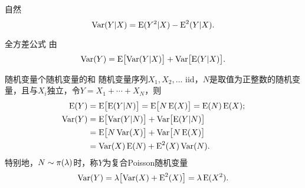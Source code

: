自然
\begin{equation}
	\Var(Y|X)=\E(Y^2|X)-\E^2(Y|X).
\end{equation}
\begin{theorem}{全方差公式}{}
	由
	\begin{equation}
		\Var(Y)=\E\bigfkh{\Var(Y|X)}+\Var\bigfkh{\E(Y|X)}.
	\end{equation}
\end{theorem}
\begin{example}{随机变量个随机变量的和}{}
	随机变量序列$X_1,X_2,\ldots$ iid，$N$是取值为正整数的随机变量，且与$X_i$独立，令$Y=X_1+\cdots+X_N$，则
	\begin{subequations}
		\begin{align}
			\E(Y)&=\E\bigfkh{\E(Y|N)}=\E\bigfkh{N\E(X)}=\E(N)\E(X);\\
			\notag
			\Var(Y)&=\E\bigfkh{\Var(Y|N)}+\Var\bigfkh{\E(Y|N)}\\
			\notag
			&=\E\bigfkh{N\Var(X)}+\Var\bigfkh{N\E(X)}\\
			&=\Var(X)\E(N)+\E^2(X)\Var(N).
		\end{align}
	\end{subequations}
	特别地，$N\sim\Pois(\lambda)$时，称$Y$为复合Poisson随机变量
	\[
		\Var(Y)=\lambda\bigfkh{\Var(X)+\E^2(X)}=\lambda\E(X^2).
	\]
\end{example}